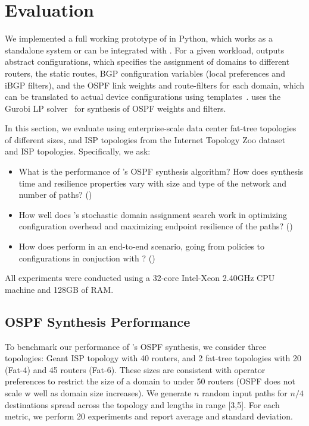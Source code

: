 \section{Evaluation}
 \label{sec:evaluation}
 
 We implemented a full working
 prototype of \name in Python, which works as a standalone
 system or can be integrated with \genesis. For a given
 workload, \name outputs abstract configurations, which
 specifies the assignment of domains to different routers,
 the static routes, BGP configuration variables (local 
 preferences and iBGP filters), and the OSPF link weights
 and route-filters for each domain, which can be 
 translated to actual device configurations using templates~\cite{template}.
 \name uses the Gurobi LP solver~\cite{gurobi} for synthesis of 
 OSPF weights and filters. 
 
In this section, we evaluate \Name using
enterprise-scale data
center fat-tree topologies~\cite{fattree} of different 
sizes, and ISP topologies from the Internet Topology Zoo 
dataset~\cite{zoo} and ISP topologies.  
Specifically, we ask:
\begin{itemize}
	\item What is the performance of \Name's OSPF synthesis
	algorithm? How does synthesis time and resilience properties 
	vary with size and type of the network and number of paths? ()
	
	\item How well does \name's stochastic domain assignment 
	search work in optimizing configuration overhead
	and maximizing endpoint resilience of the paths? ()
	
	\item How does \name perform in an end-to-end scenario, going
	from policies to configurations in conjuction with \genesis? 
	()
\end{itemize}
All experiments were conducted using a
32-core Intel-Xeon 2.40GHz CPU machine and
128GB of RAM.

\subsection{OSPF Synthesis Performance}
To benchmark our performance of \name's OSPF synthesis,
we consider three topologies: Geant ISP topology with 40 routers,
and 2 fat-tree topologies with 20 (Fat-4) and 45 routers (Fat-6). 
These sizes are consistent with operator preferences to restrict
the size of a domain to under 50 routers (OSPF does not scale w
well as domain size increases). We generate $n$ random input paths for
$n/4$ destinations spread across the topology and 
lengths in range [3,5]. For each metric, we perform 20 experiments
and report average and standard deviation. 

